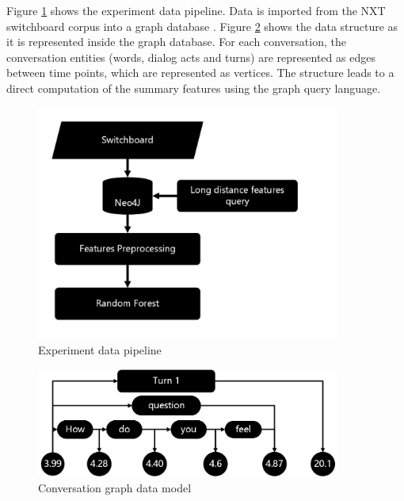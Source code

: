    Figure \ref{pipeline} shows the experiment data pipeline. Data is imported from the NXT switchboard corpus \cite{calhoun2010nxt} into a graph database \cite{Webber:2012:PIN:2384716.2384777}.
   Figure \ref{datastructure} shows the data structure as it is represented inside the graph database. For each conversation, the conversation entities (words, dialog acts and turns) are represented as edges between time points, which are represented as vertices. The structure leads to a direct computation of the summary features using the graph query language.
\begin{figure}[ht!]
 \centering
 \includegraphics[width=10cm,keepaspectratio]{pipeline1.pdf}
 \caption{Experiment data pipeline
 \label{pipeline}}
 \end{figure}



\begin{figure}[ht!]
\centering
\includegraphics[width=10cm,keepaspectratio]{graph5.jpg}
\caption{Conversation graph data model \label{datastructure}}
\end{figure}

